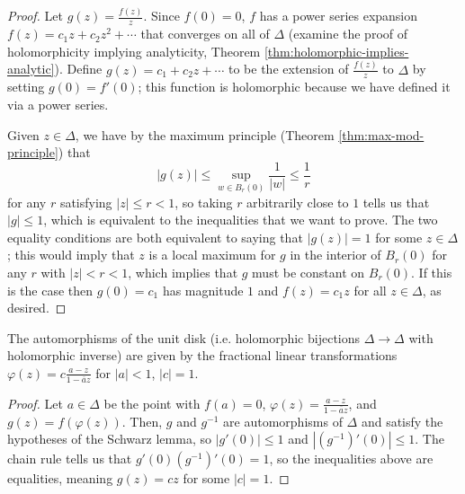 \documentclass[10pt]{article}
\providecommand{\ol}{\overline}
\providecommand{\inv}{^{-1}}
\providecommand{\abs}[1]{\left\lvert{#1}\right\rvert}
\begin{document}
\begin{proof}
    Let $g(z) = \frac{f(z)}{z}$.
    Since $f(0) = 0$, $f$ has a power series
    expansion $f(z) = c_1z + c_2z^2 + \cdots$
    that converges on all of $\Delta$
    (examine the proof of holomorphicity implying analyticity,
    Theorem \ref{thm:holomorphic-implies-analytic}).
    Define $g(z) = c_1 + c_2z + \cdots$
    to be the extension of $\frac{f(z)}z$ to $\Delta$
    by setting $g(0) = f'(0)$; this function is holomorphic
    because we have defined it via a power series.

    Given $z\in\Delta$, we have by the maximum principle
    (Theorem \ref{thm:max-mod-principle}) that
    \begin{equation*}
	\abs{g(z)} \le \sup_{w\in B_r(0)} \frac 1{\abs w}
	\le \frac 1r
    \end{equation*}
    for any $r$ satisfying $\abs z \le r < 1$,
    so taking $ r$ arbitrarily close to $1$ tells us that
    $\abs g \le 1$, which is equivalent to the inequalities
    that we want to prove. The two equality conditions
    are both equivalent to saying that $\abs{g(z)} = 1$
    for some $z\in\Delta$; this would imply that
    $z$ is a local maximum for $g$ in the interior of
    $B_r(0)$ for any $r$ with $\abs z < r < 1$,
    which implies that $g$ must be constant on $B_r(0)$.
    If this is the case then $g(0) = c_1$ has magnitude $1$
    and $f(z) = c_1z$ for all $z\in\Delta$, as desired.
\end{proof}

\begin{corollary}
    \label{coro:automorphism-disk}
    The automorphisms of the unit disk
    (i.e. holomorphic bijections $\Delta\to\Delta$ with holomorphic inverse)
    are given by the fractional linear transformations
    $\varphi(z) = c\frac{a-z}{1-\ol az}$
    for $\abs a < 1$, $\abs c = 1$.
\end{corollary}

\begin{proof}
    Let $a\in\Delta$ be the point with $f(a) = 0$,
    $\varphi(z) = \frac{a-z}{1-\ol az}$,
    and $g(z) = f(\varphi(z))$. Then, $g$ and $g\inv$
    are automorphisms of $\Delta$ and satisfy the hypotheses
    of the Schwarz lemma, so $\abs{g'(0)}\le 1$
    and $\abs{(g\inv)'(0)}\le 1$.
    The chain rule tells us that $g'(0)(g\inv)'(0) = 1$,
    so the inequalities above are equalities,
    meaning $g(z) = cz$ for some $\abs c = 1$.
\end{proof}

\end{document}
